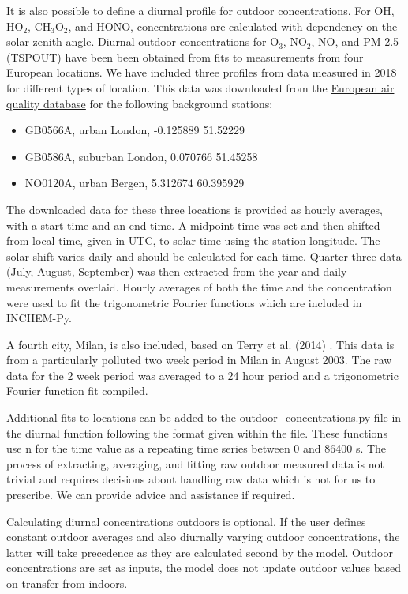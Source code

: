 \documentclass[a4paper]{refart}
\begin{document}
It is also possible to define a diurnal profile for outdoor concentrations. For OH, HO$_2$, CH$_3$O$_2$, and HONO, concentrations are calculated with dependency on the solar zenith angle. Diurnal outdoor concentrations for O$_3$, NO$_2$, NO, and PM 2.5 (TSPOUT) have been been obtained from fits to measurements from four European locations. We have included three profiles from data measured in 2018 for different types of location. This data was downloaded from the \href{https://aqportal.discomap.eea.europa.eu/products/data-viewers/statistical-viewer-expert/}{European air quality database} for the following background stations:
\begin{itemize}
    \item GB0566A, urban London, -0.125889	51.52229
    \item GB0586A, suburban London, 0.070766	51.45258
    \item NO0120A, urban Bergen, 5.312674	60.395929
\end{itemize}
The downloaded data for these three locations is provided as hourly averages, with a start time and an end time. A midpoint time was set and then shifted from local time, given in UTC, to solar time using the station longitude. The solar shift varies daily and should be calculated for each time. Quarter three data (July, August, September) was then extracted from the year and daily measurements overlaid. Hourly averages of both the time and the concentration were used to fit the trigonometric Fourier functions which are included in INCHEM-Py.

A fourth city, Milan, is also included, based on Terry et al. (2014) \cite{Terry2014}. This data is from a particularly polluted two week period in Milan in August 2003. The raw data for the 2 week period was averaged to a 24 hour period and a trigonometric Fourier function fit compiled.

Additional fits to locations can be added to the outdoor\_concentrations.py file in the diurnal function following the format given within the file. These functions use n for the time value as a repeating time series between 0 and 86400 s. The process of extracting, averaging, and fitting raw outdoor measured data is not trivial and requires decisions about handling raw data which is not for us to prescribe. We can provide advice and assistance if required.

Calculating diurnal concentrations outdoors is optional. If the user defines constant outdoor averages and also diurnally varying outdoor concentrations, the latter will take precedence as they are calculated second by the model. Outdoor concentrations are set as inputs, the model does not update outdoor values based on transfer from indoors.
\end{document}

